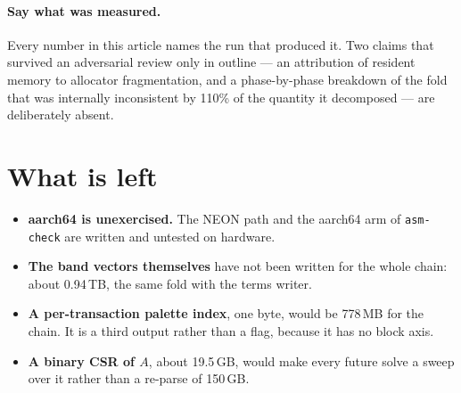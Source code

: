 \documentclass[11pt,a4paper]{article}
\begin{document}
\paragraph{Say what was measured.} Every number in this article names the run
that produced it. Two claims that survived an adversarial review only in outline
--- an attribution of resident memory to allocator fragmentation, and a
phase-by-phase breakdown of the fold that was internally inconsistent by 110\%
of the quantity it decomposed --- are deliberately absent.

\section{What is left}

\begin{itemize}
  \item \textbf{aarch64 is unexercised.} The NEON path and the aarch64 arm of
        \texttt{asm-check} are written and untested on hardware.
  \item \textbf{The band vectors themselves} have not been written for the whole
        chain: about 0.94\,TB, the same fold with the terms writer.
  \item \textbf{A per-transaction palette index}, one byte, would be 778\,MB for
        the chain. It is a third output rather than a flag, because it has no
        block axis.
  \item \textbf{A binary CSR of $A$}, about 19.5\,GB, would make every future
        solve a sweep over it rather than a re-parse of 150\,GB.
\end{itemize}
\end{document}
